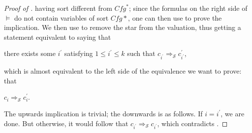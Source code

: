 \documentclass{article}
\newenvironment{proofenv}
  {
    \VerbatimEnvironment\begin{tcolorbox}[colback=black!0!white] %
  }
  {
   \end{tcolorbox}
  }
\begin{document}
\begin{proof}[Proof of ]
having sort different from $\mathit{Cfg}^*$; since the formulas on the right side of $\vDash$ do not contain
variables of sort $\mathit{Cfg}*$, one can then use  to prove the implication.
We then use  to remove the star from the valuation, thus getting a statement
equivalent to saying that
\begin{proofenv}
there exists some $i^\prime$ satisfying $1 \leq i^\prime \leq k$
such that $c_{i^\prime} \Rightarrow_{\mathcal{S}} c^\prime_{i^\prime}$,
\end{proofenv}
which is almost equivalent to the left side of the equivalence we want to prove:
that
\begin{proofenv}
$c_{i} \Rightarrow_{\mathcal{S}} c^\prime_{i}$.
\end{proofenv}
The upwards implication is trivial; the downwards is as follows. If $i = i^\prime$, we are done.
But otherwise, it would follow that $c_{i^\prime} \Rightarrow_{\mathcal{S}} c_{i^\prime}$,
which contradicts .
\end{proof}
\end{document}
